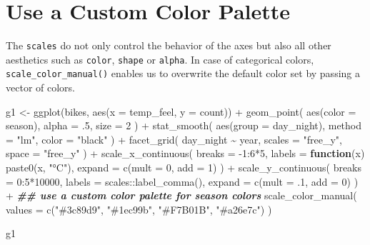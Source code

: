 \documentclass[
]{krantz}
\makeatletter
\newenvironment{Shaded}{\begin{snugshade}}{\end{snugshade}}
\newcommand{\AttributeTok}[1]{\textcolor[rgb]{0.61,0.61,0.61}{#1}}
\newcommand{\ControlFlowTok}[1]{\textcolor[rgb]{0.27,0.27,0.27}{\textbf{#1}}}
\newcommand{\DecValTok}[1]{\textcolor[rgb]{0.06,0.06,0.06}{#1}}
\newcommand{\DocumentationTok}[1]{\textcolor[rgb]{0.37,0.37,0.37}{\textbf{\textit{#1}}}}
\newcommand{\FunctionTok}[1]{\textcolor[rgb]{0,0,0}{#1}}
\newcommand{\NormalTok}[1]{#1}
\newcommand{\OtherTok}[1]{\textcolor[rgb]{0.37,0.37,0.37}{#1}}
\newcommand{\SpecialCharTok}[1]{\textcolor[rgb]{0,0,0}{#1}}
\newcommand{\StringTok}[1]{\textcolor[rgb]{0.5,0.5,0.5}{#1}}
\newenvironment{kframe}{%
\medskip{}
\setlength{\fboxsep}{.8em}
 \def\at@end@of@kframe{}%
 \ifinner\ifhmode%
  \def\at@end@of@kframe{\end{minipage}}%
  \begin{minipage}{\columnwidth}%
 \fi\fi%
 \def\FrameCommand##1{\hskip\@totalleftmargin \hskip-\fboxsep
 \colorbox{shadecolor}{##1}\hskip-\fboxsep
     \hskip-\linewidth \hskip-\@totalleftmargin \hskip\columnwidth}%
 \MakeFramed {\advance\hsize-\width
   \@totalleftmargin\z@ \linewidth\hsize
   \@setminipage}}%
 {\par\unskip\endMakeFramed%
 \at@end@of@kframe}
\renewenvironment{Shaded}{\begin{kframe}}{\end{kframe}}
\makeatother
\begin{document}
\hypertarget{color-scaling}{%
\section{Use a Custom Color Palette}\label{color-scaling}}

The \texttt{scales} do not only control the behavior of the axes but also all other aesthetics such as \texttt{color}, \texttt{shape} or \texttt{alpha}. In case of categorical colors, \texttt{scale\_color\_manual()} enables us to overwrite the default color set by passing a vector of colors.

\begin{Shaded}
\begin{Highlighting}[]
\NormalTok{g1 }\OtherTok{\textless{}{-}} \FunctionTok{ggplot}\NormalTok{(bikes, }\FunctionTok{aes}\NormalTok{(}\AttributeTok{x =}\NormalTok{ temp\_feel, }\AttributeTok{y =}\NormalTok{ count)) }\SpecialCharTok{+} 
  \FunctionTok{geom\_point}\NormalTok{(}
    \FunctionTok{aes}\NormalTok{(}\AttributeTok{color =}\NormalTok{ season), }\AttributeTok{alpha =}\NormalTok{ .}\DecValTok{5}\NormalTok{, }\AttributeTok{size =} \DecValTok{2}
\NormalTok{  ) }\SpecialCharTok{+} 
  \FunctionTok{stat\_smooth}\NormalTok{(}
    \FunctionTok{aes}\NormalTok{(}\AttributeTok{group =}\NormalTok{ day\_night), }\AttributeTok{method =} \StringTok{"lm"}\NormalTok{, }\AttributeTok{color =} \StringTok{"black"}
\NormalTok{  ) }\SpecialCharTok{+}
  \FunctionTok{facet\_grid}\NormalTok{(}
\NormalTok{    day\_night }\SpecialCharTok{\textasciitilde{}}\NormalTok{ year, }\AttributeTok{scales =} \StringTok{"free\_y"}\NormalTok{, }\AttributeTok{space =} \StringTok{"free\_y"}
\NormalTok{  ) }\SpecialCharTok{+}
  \FunctionTok{scale\_x\_continuous}\NormalTok{(}
    \AttributeTok{breaks =} \SpecialCharTok{{-}}\DecValTok{1}\SpecialCharTok{:}\DecValTok{6}\SpecialCharTok{*}\DecValTok{5}\NormalTok{, }\AttributeTok{labels =} \ControlFlowTok{function}\NormalTok{(x) }\FunctionTok{paste0}\NormalTok{(x, }\StringTok{"°C"}\NormalTok{), }\AttributeTok{expand =} \FunctionTok{c}\NormalTok{(}\AttributeTok{mult =} \DecValTok{0}\NormalTok{, }\AttributeTok{add =} \DecValTok{1}\NormalTok{)}
\NormalTok{  ) }\SpecialCharTok{+}
  \FunctionTok{scale\_y\_continuous}\NormalTok{(}
    \AttributeTok{breaks =} \DecValTok{0}\SpecialCharTok{:}\DecValTok{5}\SpecialCharTok{*}\DecValTok{10000}\NormalTok{, }\AttributeTok{labels =}\NormalTok{ scales}\SpecialCharTok{::}\FunctionTok{label\_comma}\NormalTok{(), }\AttributeTok{expand =} \FunctionTok{c}\NormalTok{(}\AttributeTok{mult =}\NormalTok{ .}\DecValTok{1}\NormalTok{, }\AttributeTok{add =} \DecValTok{0}\NormalTok{)}
\NormalTok{  ) }\SpecialCharTok{+}
  \DocumentationTok{\#\# use a custom color palette for season colors}
  \FunctionTok{scale\_color\_manual}\NormalTok{(}
    \AttributeTok{values =} \FunctionTok{c}\NormalTok{(}\StringTok{"\#3c89d9"}\NormalTok{, }\StringTok{"\#1ec99b"}\NormalTok{, }\StringTok{"\#F7B01B"}\NormalTok{, }\StringTok{"\#a26e7c"}\NormalTok{)}
\NormalTok{  )}

\NormalTok{g1}
\end{Highlighting}
\end{Shaded}
\end{document}
